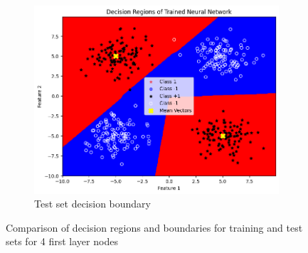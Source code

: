 \documentclass[a4paper,12pt]{article}
\begin{document}
\begin{figure}[H]
    \begin{subfigure}{0.45\textwidth}
        \centering
        \includegraphics[width=\textwidth]{2.2_4_Test.png}
        \caption{Test set decision boundary}
    \end{subfigure}

    \caption{Comparison of decision regions and boundaries for training and test sets for 4 first layer nodes} 
\end{figure}
\end{document}
